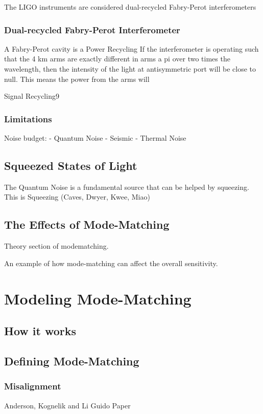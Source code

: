 \documentclass[10pt,a4paper]{book}
\begin{document}
	
	
		
	The LIGO instruments are considered dual-recycled Fabry-Perot interferometers
	
		\subsection{Dual-recycled Fabry-Perot Interferometer}
		A Fabry-Perot cavity is a 
		Power Recycling
		If the interferometer is operating such that the 4 km arms are exactly different in arms a pi over two times the wavelength, then the intensity of the light at antisymmetric port will be close to null.  This means the power from the arms will
		
		Signal Recycling9
		\subsection{Limitations}
		Noise budget:
		- Quantum Noise
		- Seismic
		- Thermal Noise
	\section{Squeezed States of Light}
	The Quantum Noise is a fundamental source that can be helped by squeezing. This is Squeezing (Caves, Dwyer, Kwee, Miao)
		
	\section{The Effects of Mode-Matching}
	Theory section of modematching.
	
	An example of how mode-matching can affect the overall sensitivity.
	
	
	
\chapter{Modeling Mode-Matching}	
	\section{How it works}

	\section{Defining Mode-Matching}
		\subsection{Misalignment}
		Anderson, Kognelik and Li
		\newline
		Guido Paper
		\newline
		
\end{document}
